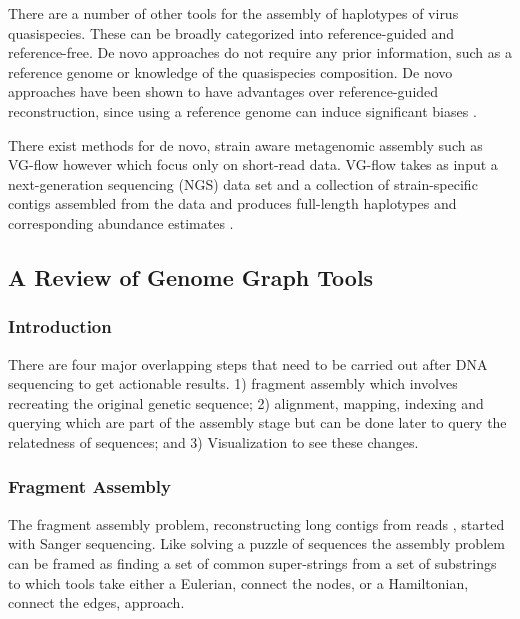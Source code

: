 \documentclass[a4paper]{article}
\begin{document}
There are a number of other tools for the assembly of haplotypes of virus
quasispecies.
These can be broadly categorized into reference-guided and reference-free.
De novo approaches do not require any prior information, such as a reference
genome or knowledge of the quasispecies composition. De novo approaches have
been shown to have advantages over reference-guided reconstruction, since using
a reference genome can induce significant biases
\cite{baaijensStrainawareAssemblyGenomes2020}.

There exist methods for de novo, strain aware metagenomic assembly such as 
VG-flow \cite{baaijensStrainawareAssemblyGenomes2020} however which focus only on 
short-read data.
VG-flow takes as input a next-generation sequencing (NGS) data set and a 
collection of strain-specific contigs assembled from the data and produces 
full-length haplotypes and corresponding abundance estimates 
\cite{baaijensStrainawareAssemblyGenomes2020}.
\subsection{A Review of Genome Graph Tools}
\label{sec:orgc433791}
\subsubsection{Introduction}
\label{sec:orgdddc68a}

There are four major overlapping steps that need to be carried out after DNA 
sequencing to get actionable results. 1) fragment assembly which involves 
recreating the original genetic sequence; 2) alignment, mapping, indexing and 
querying which are part of the assembly stage but can be done later to query the
relatedness of sequences; and 3) Visualization to see these changes.\cite{flicekSenseSequenceReads2009}

\subsubsection{Fragment Assembly}
\label{sec:orgca0d9fe}
The fragment assembly problem, reconstructing long contigs from reads
\cite{chikhiCompactingBruijnGraphs2016}, started with Sanger sequencing.
Like solving a puzzle of sequences the assembly problem can be framed as finding
a set of common super-strings from a set of substrings to which tools take 
either a Eulerian, connect the nodes, or a Hamiltonian, connect the edges, 
approach.
\end{document}
